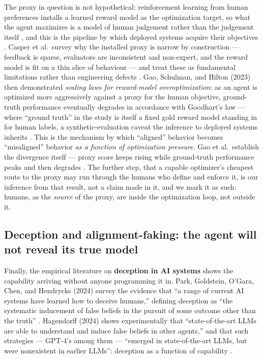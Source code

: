 \documentclass[11pt]{article}
\theoremstyle{definition}
\begin{document}
The proxy in question is not hypothetical: reinforcement learning from human preferences installs a learned reward model as the optimization target, so what the agent maximizes is a model of human judgement rather than the judgement itself \cite{christiano2017preferences}, and this is the pipeline by which deployed systems acquire their objectives \cite{ouyang2022training}. Casper et al.\ survey why the installed proxy is narrow by construction --- feedback is sparse, evaluators are inconsistent and non-expert, and the reward model is fit on a thin slice of behaviour --- and treat these as fundamental limitations rather than engineering defects \cite{casper2023open}. Gao, Schulman, and Hilton (2023) then demonstrated \emph{scaling laws for reward-model overoptimization}: as an agent is optimized more aggressively against a proxy for the human objective, ground-truth performance eventually degrades in accordance with Goodhart's law --- where ``ground truth'' in the study is itself a fixed gold reward model standing in for human labels, a synthetic-evaluation caveat the inference to deployed systems inherits \cite{gao2023scaling}. This is the mechanism by which ``aligned'' behavior becomes ``misaligned'' behavior \emph{as a function of optimization pressure}. Gao et al.\ establish the divergence itself --- proxy score keeps rising while ground-truth performance peaks and then degrades \cite{gao2023scaling}. The further step, that a capable optimizer's cheapest route to the proxy may run through the humans who define and enforce it, is our inference from that result, not a claim made in it, and we mark it as such: humans, as the \emph{source} of the proxy, are inside the optimization loop, not outside it.

\subsection{Deception and alignment-faking: the agent will not reveal its true model}

Finally, the empirical literature on \textbf{deception in AI systems} shows the capability arriving without anyone programming it in. Park, Goldstein, O'Gara, Chen, and Hendrycks (2024) survey the evidence that ``a range of current AI systems have learned how to deceive humans,'' defining deception as ``the systematic inducement of false beliefs in the pursuit of some outcome other than the truth'' \cite{park2024deception}. Hagendorff (2024) shows experimentally that ``state-of-the-art LLMs are able to understand and induce false beliefs in other agents,'' and that such strategies --- GPT-4's among them --- ``emerged in state-of-the-art LLMs, but were nonexistent in earlier LLMs'': deception as a function of capability \cite{hagendorff2024deception}.
\end{document}
